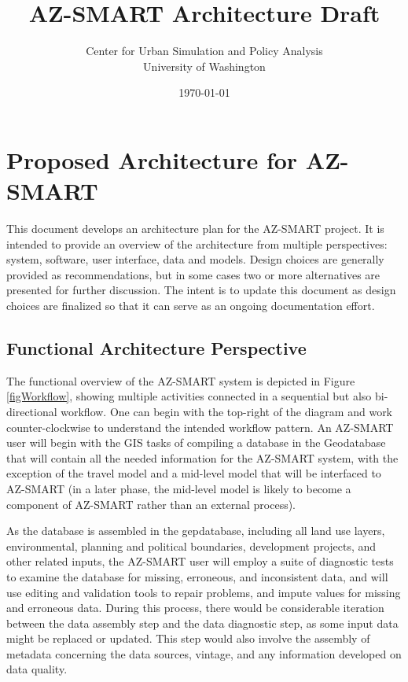 \documentclass[titlepage]{article}
\begin{document}
\title{AZ-SMART Architecture Draft}
\author{Center for Urban Simulation and Policy Analysis\\University of Washington}
\date{\today}
\maketitle


\section{Proposed Architecture for AZ-SMART}
This document develops an architecture plan for the AZ-SMART project.  It is intended to provide an overview of the architecture from multiple perspectives: system, software, user interface, data and models.  Design choices are generally provided as recommendations, but in some cases two or more alternatives are presented for further discussion.  The intent is to update this document as design choices are finalized so that it can serve as an ongoing documentation effort.

\subsection{Functional Architecture Perspective}
The functional overview of the AZ-SMART system is depicted in Figure \ref{figWorkflow}, showing multiple activities connected in a sequential but also bi-directional workflow.  One can begin with the top-right of the diagram and work counter-clockwise to understand the intended workflow pattern.  An AZ-SMART user will begin with the GIS tasks of compiling a database in the Geodatabase that will contain all the needed information for the AZ-SMART system, with the exception of the travel model and a mid-level model that will be interfaced to AZ-SMART (in a later phase, the mid-level model is likely to become a component of AZ-SMART rather than an external process). 

As the database is assembled in the gepdatabase, including all land use layers, environmental, planning and political boundaries, development projects, and other related inputs, the AZ-SMART user will employ a suite of diagnostic tests to examine the database for missing, erroneous, and inconsistent data, and will use editing and validation tools to repair problems, and impute values for missing and erroneous data.  During this process, there would be considerable iteration between the data assembly step and the data diagnostic step, as some input data might be replaced or updated.  This step would also involve the assembly of metadata concerning the data sources, vintage, and any information developed on data quality.
\end{document}
